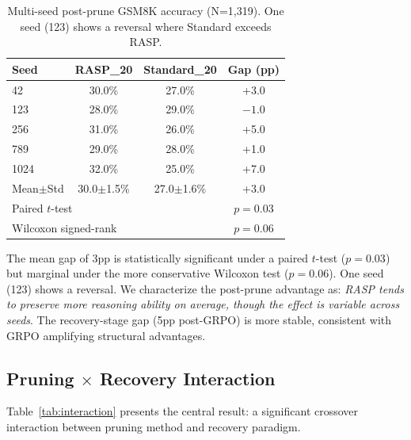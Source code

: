 \documentclass[11pt]{article}
\begin{document}
\begin{table}[t]
\centering
\caption{Multi-seed post-prune GSM8K accuracy (N=1,319). One seed (123) shows a reversal where Standard exceeds RASP.}
\label{tab:multiseed}
\begin{tabular}{lccc}
\toprule
\textbf{Seed} & \textbf{RASP\_20} & \textbf{Standard\_20} & \textbf{Gap (pp)} \\
\midrule
42 & 30.0\% & 27.0\% & +3.0 \\
123 & 28.0\% & 29.0\% & $-1.0$ \\
256 & 31.0\% & 26.0\% & +5.0 \\
789 & 29.0\% & 28.0\% & +1.0 \\
1024 & 32.0\% & 25.0\% & +7.0 \\
\midrule
Mean$\pm$Std & 30.0$\pm$1.5\% & 27.0$\pm$1.6\% & +3.0 \\
\midrule
\multicolumn{3}{l}{Paired $t$-test} & $p = 0.03$ \\
\multicolumn{3}{l}{Wilcoxon signed-rank} & $p = 0.06$ \\
\bottomrule
\end{tabular}
\end{table}

The mean gap of 3pp is statistically significant under a paired $t$-test ($p{=}0.03$) but marginal under the more conservative Wilcoxon test ($p{=}0.06$). One seed (123) shows a reversal. We characterize the post-prune advantage as: \emph{RASP tends to preserve more reasoning ability on average, though the effect is variable across seeds}. The recovery-stage gap (5pp post-GRPO) is more stable, consistent with GRPO amplifying structural advantages.

\subsection{Pruning $\times$ Recovery Interaction}
\label{sec:interaction}

Table~\ref{tab:interaction} presents the central result: a significant crossover interaction between pruning method and recovery paradigm.
\end{document}
